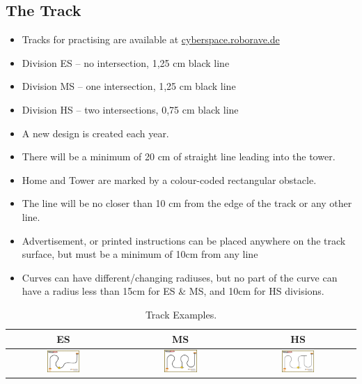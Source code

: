 \documentclass[a4paper,12pt]{article}
\begin{document}
\subsection{The Track}

\begin{itemize}
	\item Tracks for practising are available at
\href{https://cyberspace.roborave.de}{cyberspace.roborave.de}
	\item Division ES – no intersection, 1,25 cm black line
	\item Division MS – one intersection, 1,25 cm black line
	\item Division HS – two intersections, 0,75 cm black line
	\item A new design is created each year.
	\item There will be a minimum of 20 cm of straight line leading into
		the tower.
	\item Home and Tower are marked by a colour-coded rectangular obstacle.
	\item The line will be no closer than 10 cm from the edge of the track
		or any other line.
	\item Advertisement, or printed instructions can be placed anywhere on
		the track surface, but must be a minimum of 10cm from any line
	\item Curves can have different/changing radiuses, but no part of the
		curve can have a radius less than 15cm for ES \& MS, and 10cm
		for HS divisions.
\end{itemize}

\begin{center}
\begin{table}[H]
	\begin{tabular}{|c|c|c|} \hline
		ES & MS & HS \\
		\hline
\includegraphics[width=0.3\textwidth]{images/cyberspace/linefollowing_es.png}
&
\includegraphics[width=0.3\textwidth]{images/cyberspace/linefollowing_ms.png}
&
\includegraphics[width=0.3\textwidth]{images/cyberspace/linefollowing_hs.png}
\\
    		\hline
	\end{tabular}
\caption{\label{tab:table-name}Track Examples.}
\end{table}
\end{center}
\end{document}
